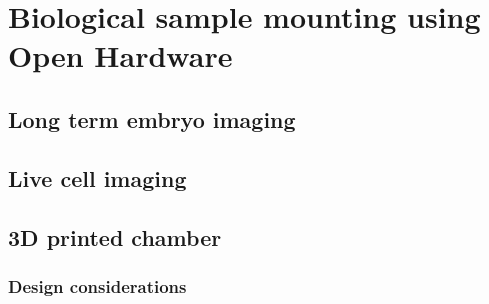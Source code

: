 \ifpdf
    \graphicspath{{Chapter/chamber/Figs/Raster/}{Chapter/chamber/Figs/PDF/}{Chapter6/Figs/}}
\else
    \graphicspath{{Chapter/chamber/Figs/Vector/}{Chapter/chamber/Figs/}}
\fi

\chapter{Biological sample mounting using Open Hardware}
\section{Long term embryo imaging}
\section{Live cell imaging}
\section{3D printed chamber}
\subsection{Design considerations}

